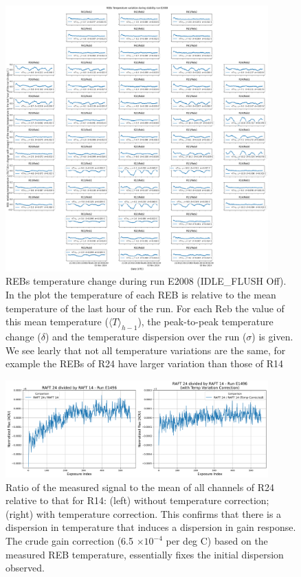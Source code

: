\begin{figure}[ht]
\begin{centering}
\includegraphics[width=0.9\textwidth]{figures/FocalPlanTempRun_E2008.png}
\end{centering}
\caption{REBs temperature change during run E2008 (IDLE\_FLUSH Off). In the plot the temperature of each REB is relative to the mean temperature of the last hour of the run. For each Reb the value of this mean temperature ($\langle T \rangle_{h-1}$), the peak-to-peak temperature change ($\delta$) and the temperature dispersion over the run ($\sigma$) is given. We see learly that not all temperature variations are the same, for example the REBs of R24 have larger variation than those of R14} 
\label{fig:tempE2008}
\end{figure}
\begin{figure}[ht] %
\begin{centering}
\includegraphics[width=0.9\textwidth]{figures/raft24div14.png}
\end{centering}
\caption{Ratio of the measured signal to the mean of all channels of R24 relative to that for R14:  (left) without temperature correction; (right) with temperature correction. This confirms that there is a  dispersion in temperature that induces a dispersion in gain response. The crude gain correction (6.5 $\times 10^{-4}$ per deg C) based on the measured REB temperature, essentially fixes the initial dispersion observed.   }
\label{fig:R24divR14}
\end{figure}


